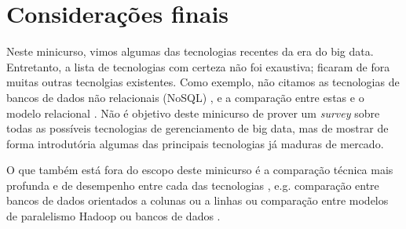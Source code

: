 \section{Considerações finais}
\label{sec:final}

Neste minicurso, vimos algumas das tecnologias recentes da era do big data. Entretanto, 
a lista de tecnologias com certeza não foi exaustiva; ficaram de fora muitas outras
tecnolgias existentes. Como exemplo, não citamos as tecnologias de bancos de dados
não relacionais (NoSQL) \cite{han2011survey}, e a comparação entre estas e 
o modelo relacional \cite{cattell2011scalable, stonebraker2010sql, stonebraker2012newsql}.
Não é objetivo deste minicurso de prover um \textit{survey} sobre todas as
possíveis tecnologias de gerenciamento de big data, mas de mostrar de forma introdutória
algumas das principais tecnologias já maduras de mercado.

O que também está fora do escopo deste minicurso é a comparação técnica mais profunda e 
de desempenho entre cada das tecnologias \cite{Pavlo2009}, e.g. comparação entre 
bancos de dados orientados a colunas ou a linhas \cite{Abadi2008} ou comparação entre
modelos de paralelismo Hadoop ou bancos de dados \cite{Stonebraker2010}. 

